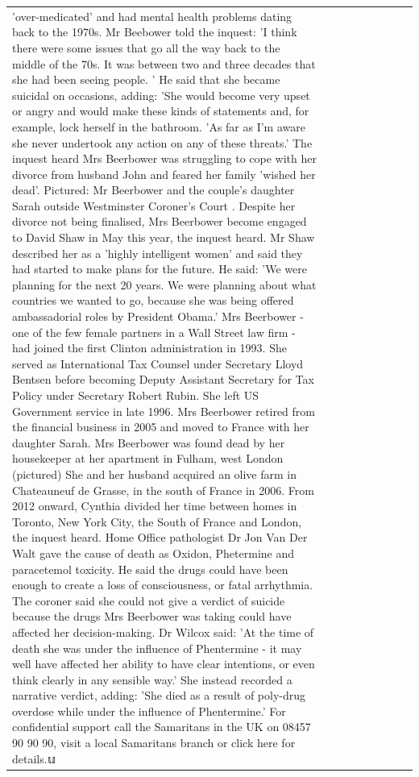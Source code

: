 \begin{table}[H]
\begin{tabular}{lllrlllll}
'over-medicated' and had mental health problems dating back to the 1970s. Mr Beebower told the inquest: 'I think there were some issues that go all the way back to the middle of the 70s. It was between two and three decades that she had been seeing people. ' He said that she became suicidal on occasions, adding: 'She would become very upset or angry and would make these kinds of statements and, for example, lock herself in the bathroom. 'As far as I'm aware she never undertook any action on any of these threats.' The inquest heard Mrs Beerbower was struggling to cope with her divorce from husband John and feared her family 'wished her dead'. Pictured: Mr Beerbower and the couple's daughter Sarah outside Westminster Coroner's Court . Despite her divorce not being finalised, Mrs Beerbower become engaged to David Shaw in May this year, the inquest heard. Mr Shaw described her as a 'highly intelligent women' and said they had started to make plans for the future. He said: 'We were planning for the next 20 years. We were planning about what countries we wanted to go, because she was being offered ambassadorial roles by President Obama.' Mrs Beerbower - one of the few female partners in a Wall Street law firm - had joined the first Clinton administration in 1993. She served as International Tax Counsel under Secretary Lloyd Bentsen before becoming Deputy Assistant Secretary for Tax Policy under Secretary Robert Rubin. She left US Government service in late 1996. Mrs Beerbower retired from the financial business in 2005 and moved to France with her daughter Sarah. Mrs Beerbower was found dead by her housekeeper at her apartment in Fulham, west London (pictured) She and her husband acquired an olive farm in Chateauneuf de Grasse, in the south of France in 2006. From 2012 onward, Cynthia divided her time between homes in Toronto, New York City, the South of France and London, the inquest heard. Home Office pathologist Dr Jon Van Der Walt gave the cause of death as Oxidon, Phetermine and paracetemol toxicity. He said the drugs could have been enough to create a loss of consciousness, or fatal arrhythmia. The coroner said she could not give a verdict of suicide because the drugs Mrs Beerbower was taking could have affected her decision-making. Dr Wilcox said: 'At the time of death she was under the influence of Phentermine - it may well have affected her ability to have clear intentions, or even think clearly in any sensible way.' She instead recorded a narrative verdict, adding: 'She died as a result of poly-drug overdose while under the influence of Phentermine.' For confidential support call the Samaritans in the UK on 08457 90 90 90, visit a local Samaritans branch or click here for details.𝕦 \\

\end{tabular}
\end{table}
